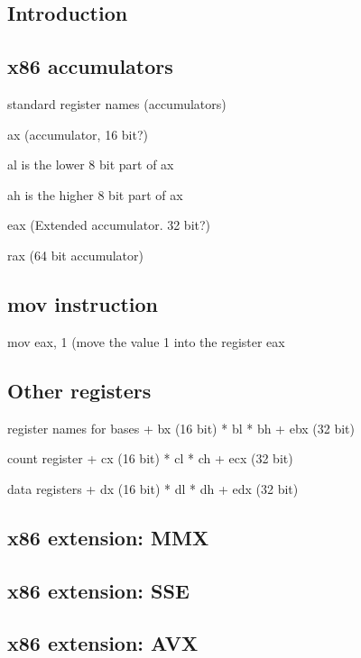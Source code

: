 
\subsection{Introduction}

\subsection{x86 accumulators}

standard register names (accumulators)

ax (accumulator, 16 bit?)

al is the lower 8 bit part of ax

ah is the higher 8 bit part of ax

eax (Extended accumulator. 32 bit?)

rax (64 bit accumulator)

\subsection{mov instruction}
mov eax, 1 (move the value 1 into the register eax
\subsection{Other registers}


register names for bases
+ bx (16 bit)
  * bl
  * bh
+ ebx (32 bit)

count register
+ cx (16 bit)
  * cl
  * ch
+ ecx (32 bit)

data registers
+ dx (16 bit)
  * dl
  * dh
+ edx (32 bit)


\subsection{x86 extension: MMX}

\subsection{x86 extension: SSE}

\subsection{x86 extension: AVX}
